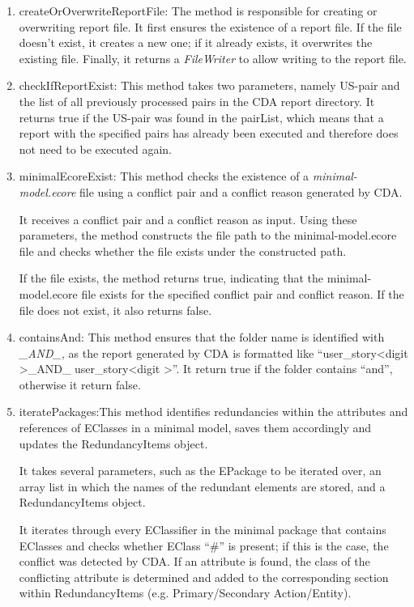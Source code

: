 \begin{enumerate}
	\item createOrOverwriteReportFile: The method is responsible for creating or overwriting report file. It first ensures the existence of a report file. If the file doesn't exist, it creates a new one; if it already exists, it overwrites the existing file. Finally, it returns a \textit{FileWriter} to allow writing to the report file.
	
	\item checkIfReportExist: This method takes two parameters, namely US-pair and the list of all previously processed pairs in the CDA report directory. It returns true if the US-pair was found in the pairList, which means that a report with the specified pairs has already been executed and therefore does not need to be executed again.
	
	\item minimalEcoreExist: This method checks the existence of a \textit{minimal-model.ecore} file using a conflict pair and a conflict reason generated by CDA.
	
	It receives a conflict pair and a conflict reason as input. Using these parameters, the method constructs the file path to the minimal-model.ecore file and checks whether the file exists under the constructed path.
	
	If the file exists, the method returns true, indicating that the minimal-model.ecore file exists for the specified conflict pair and conflict reason. If the file does not exist, it also returns false.
	
	\item containsAnd: This method ensures that the folder name is identified with \textit{\_AND\_}, as the report generated by CDA is formatted like \enquote{user\_story\textless digit \textgreater \_AND\_ user\_story\textless digit \textgreater}. It return true if the folder contains \enquote{and}, otherwise it return false.
	
	\item iteratePackages:This method identifies redundancies within the attributes and references of EClasses in a minimal model, saves them accordingly and updates the RedundancyItems object.
	
	 It takes several parameters, such as the EPackage to be iterated over, an array list in which the names of the redundant elements are stored, and a RedundancyItems object. 
	 
	 It iterates through every EClassifier in the minimal package that contains EClasses and checks whether EClass \enquote{\#} is present; if this is the case, the conflict was detected by CDA. If an attribute is found, the class of the conflicting attribute is determined and added to the corresponding section within RedundancyItems (e.g. Primary/Secondary Action/Entity). 
	 

\end{enumerate}
